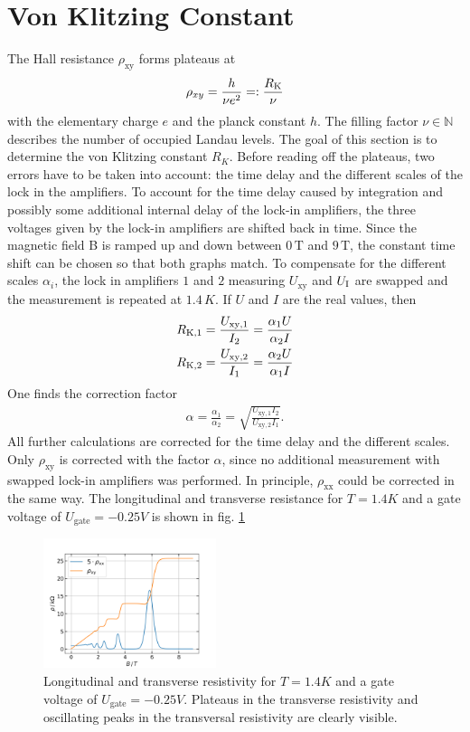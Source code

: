 \section{Von Klitzing Constant}

The Hall resistance $\rho_{\text{xy}}$ forms plateaus at \begin{align}
    \rho_{xy} = \frac{h}{\nu e^2} =: \frac{R_\text K}{\nu} \end{align} with the elementary charge $e$ and the planck constant $h$. 
The filling factor $\nu \in \mathbb N$ describes the number of occupied Landau levels.
The goal of this section is to determine the von Klitzing constant $R_K$.
Before reading off the plateaus, two errors have to be taken into account: the time delay and the different scales of the lock in the amplifiers.
To account for the time delay caused by integration and possibly some additional internal delay of the lock-in amplifiers, the three voltages given by the lock-in amplifiers are shifted back in time.
Since the magnetic field B is ramped up and down between $0\,\text{T}$ and $9\,\text{T}$, the constant time shift can be chosen so that both graphs match.
To compensate for the different scales $\alpha_i$, the lock in amplifiers $1$ and $2$ measuring $U_\text{xy}$ and $U_\text I$ are swapped and the measurement is repeated at $1.4\,K$.
If $U$ and $I$ are the real values, then 
\begin{align}
    R_{\text K,1} = \frac{U_{\text{xy}, 1}}{I_2} = \frac{\alpha_1 U}{\alpha_2 I}\\ R_{\text K,2} = \frac{U_{\text{xy}, 2}}{I_1} = \frac{\alpha_2 U}{\alpha_1 I}
\end{align} 
One finds the correction factor 
\begin{align}
    \alpha = \frac{\alpha_1}{\alpha_2} = \sqrt{\frac{U_{\text{xy},1}I_2}{U_{\text{xy}, 2}I_1}}. 
\end{align}
All further calculations are corrected for the time delay and the different scales.
Only $\rho_{\text{xy}}$ is corrected with the factor $\alpha$, since no additional measurement with swapped lock-in amplifiers was performed.
In principle, $\rho_{\text{xx}}$ could be corrected in the same way.
The longitudinal and transverse resistance for $T=1.4K$ and a gate voltage of $U_\text{gate}=-0.25V$ is shown in fig. \ref{fig:KlitzingBeispielBild} \begin{figure}[h] \centering \includegraphics[width=0.45\textwidth]{../Images/BeispielBildVomAnfang.png}
    \caption{ Longitudinal and transverse resistivity for $T=1.4K$ and a gate voltage of $U_\text{gate}=-0.25V$.
        Plateaus in the transverse resistivity and oscillating peaks in the transversal resistivity are clearly visible.
        }
    \label{fig:KlitzingBeispielBild} 
\end{figure}
